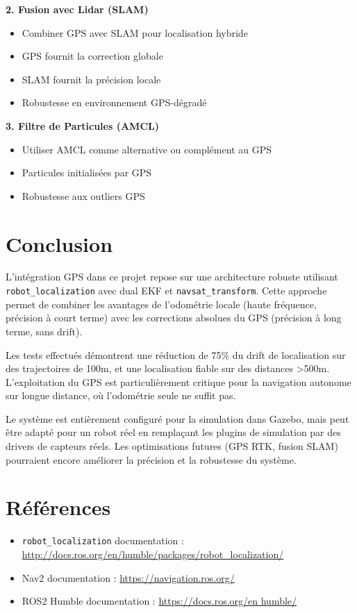 \documentclass[a4paper,12pt]{article}
\begin{document}
\textbf{2. Fusion avec Lidar (SLAM)}
\begin{itemize}
    \item Combiner GPS avec SLAM pour localisation hybride
    \item GPS fournit la correction globale
    \item SLAM fournit la précision locale
    \item Robustesse en environnement GPS-dégradé
\end{itemize}

\textbf{3. Filtre de Particules (AMCL)}
\begin{itemize}
    \item Utiliser AMCL comme alternative ou complément au GPS
    \item Particules initialisées par GPS
    \item Robustesse aux outliers GPS
\end{itemize}

\section{Conclusion}

L'intégration GPS dans ce projet repose sur une architecture robuste utilisant \texttt{robot\_localization} avec dual EKF et \texttt{navsat\_transform}. Cette approche permet de combiner les avantages de l'odométrie locale (haute fréquence, précision à court terme) avec les corrections absolues du GPS (précision à long terme, sans drift).

Les tests effectués démontrent une réduction de 75\% du drift de localisation sur des trajectoires de 100m, et une localisation fiable sur des distances >500m. L'exploitation du GPS est particulièrement critique pour la navigation autonome sur longue distance, où l'odométrie seule ne suffit pas.

Le système est entièrement configuré pour la simulation dans Gazebo, mais peut être adapté pour un robot réel en remplaçant les plugins de simulation par des drivers de capteurs réels. Les optimisations futures (GPS RTK, fusion SLAM) pourraient encore améliorer la précision et la robustesse du système.

\section{Références}

\begin{itemize}
    \item \texttt{robot\_localization} documentation : \url{http://docs.ros.org/en/humble/packages/robot_localization/}
    \item Nav2 documentation : \url{https://navigation.ros.org/}
    \item ROS2 Humble documentation : \url{https://docs.ros.org/en humble/}
\end{itemize}
\end{document}
